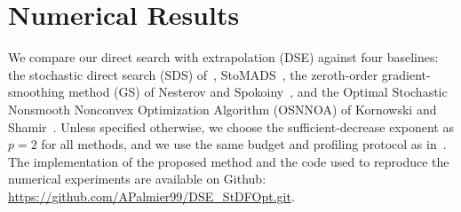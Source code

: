 \documentclass[11pt,a4paper]{article}
\newcommand{\Dexp}{p}
\begin{document}







\section{Numerical Results}
\label{sec:numerics}

We compare our direct search with extrapolation (DSE) against four baselines:
the stochastic direct search (SDS) of~\cite{MR4758401}, StoMADS~\cite{MR4238147},
the zeroth-order gradient-smoothing method (GS) of Nesterov and Spokoiny~\cite{MR3627456},
and the Optimal Stochastic Nonsmooth Nonconvex Optimization Algorithm (OSNNOA)
of Kornowski and Shamir~\cite{JMLR:kornowskishamir}.
Unless specified otherwise, we choose the sufficient-decrease exponent as $\Dexp = 2$ for all methods,
and we use the same budget and profiling protocol as in~\cite{MR4758401}.
The implementation of the proposed method and the code used to reproduce the
numerical experiments are available on Github:  \url{https://github.com/APalmier99/DSE_StDFOpt.git}.
\end{document}
